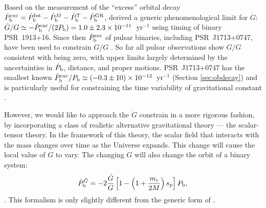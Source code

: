 Based on the measurement of the ``excess'' orbital decay 
$\dot{P}_{\rm b}^{\rm exc}=\dot{P}_{\rm b}^{\rm Int} - \dot{P}_{\rm
b}^{\dot{M}}  - \dot{P}_{\rm b}^{\rm T} - \dot{P}_{\rm b}^{\rm GR}$,
\citet{dgt88} derived a generic phenomenological limit for $\dot{G}$: 
$\dot{G}/G\simeq-\dot{P}_{\rm b}^{\rm exc}/(2P_{\rm
b})=1.0\pm2.3\times10^{-11}$~yr$^{-1}$ using timing of binary PSR~1913+16. 
{\bfref Since then $\dot{P}_{\rm b}^{\rm exc}$ of pulsar binaries, including 
PSR~J1713+0747, have been used to 
constrain $\dot{G}/G$ \citep{ktr94, lwj+09, fwe+12, nss+05}. }
So far all pulsar observations show $\dot{G}/G$ consistent with being zero, with 
upper limits largely determined by the uncertainties in $\dot P_{\rm b}$, distance, 
and proper motions.
PSR~J1713+0747 has the smallest known $\dot{P}_{\rm b}^{\rm exc}/P_{\rm
b}\simeq(-0.3\pm10)\times10^{-12}$~yr$^{-1}$ (Section \ref{sec:obdecay}) and is
particularly useful for constraining the time variability of gravitational
constant .

However, we would like to approach the $\dot{G}$ constrain in a more rigorous fashion,
by incorporating a class of realistic alternative gravitational theory --- the 
scalar-tensor theory.
In the framework of this theory,
the scalar field that interacts with the mass changes over time as the
Universe expands. This change will cause the local value of
$G$ to vary. The changing $G$ will also change
the orbit of a binary system:
\begin{equation}
\dot{P}_{\rm b}^{\dot{G}} = -2 \frac{\dot{G}}{G}
\left[1-\left( 1+\frac{m_c}{2M}\right) s_p\right]P_{\rm b},
\end{equation} \citep{nor90}.
This formalism is only slightly different from the generic form of
\citet{dgt88}.

